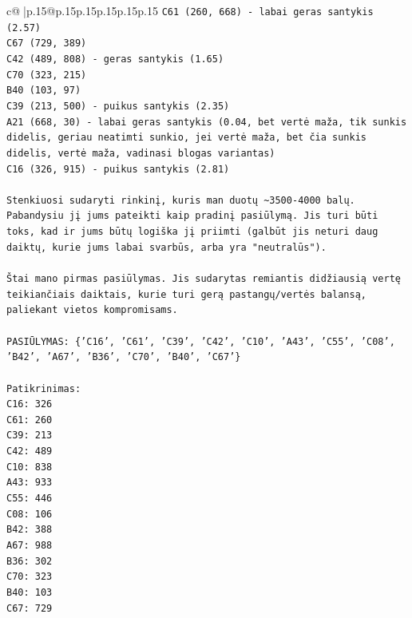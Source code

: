 \documentclass{article}
\begin{document}
{\begin{supertabular}{c@{$\;$}|p{.15\linewidth}@{}p{.15\linewidth}p{.15\linewidth}p{.15\linewidth}p{.15\linewidth}p{.15\linewidth}}
{{{\texttt{C61 (260, 668) {-} labai geras santykis (2.57)} \\
\texttt{C67 (729, 389)} \\
\texttt{C42 (489, 808) {-} geras santykis (1.65)} \\
\texttt{C70 (323, 215)} \\
\texttt{B40 (103, 97)} \\
\texttt{C39 (213, 500) {-} puikus santykis (2.35)} \\
\texttt{A21 (668, 30) {-} labai geras santykis (0.04, bet vertė maža, tik sunkis didelis, geriau neatimti sunkio, jei vertė maža, bet čia sunkis didelis, vertė maža, vadinasi blogas variantas)} \\
\texttt{C16 (326, 915) {-} puikus santykis (2.81)} \\
\\ 
\texttt{Stenkiuosi sudaryti rinkinį, kuris man duotų \textasciitilde{}3500{-}4000 balų. Pabandysiu jį jums pateikti kaip pradinį pasiūlymą. Jis turi būti toks, kad ir jums būtų logiška jį priimti (galbūt jis neturi daug daiktų, kurie jums labai svarbūs, arba yra "neutralūs").} \\
\\ 
\texttt{Štai mano pirmas pasiūlymas. Jis sudarytas remiantis didžiausią vertę teikiančiais daiktais, kurie turi gerą pastangų/vertės balansą, paliekant vietos kompromisams.} \\
\\ 
\texttt{PASIŪLYMAS: \{'C16', 'C61', 'C39', 'C42', 'C10', 'A43', 'C55', 'C08', 'B42', 'A67', 'B36', 'C70', 'B40', 'C67'\}} \\
\\ 
\texttt{Patikrinimas:} \\
\texttt{C16: 326} \\
\texttt{C61: 260} \\
\texttt{C39: 213} \\
\texttt{C42: 489} \\
\texttt{C10: 838} \\
\texttt{A43: 933} \\
\texttt{C55: 446} \\
\texttt{C08: 106} \\
\texttt{B42: 388} \\
\texttt{A67: 988} \\
\texttt{B36: 302} \\
\texttt{C70: 323} \\
\texttt{B40: 103} \\
\texttt{C67: 729} \\
}}}
\end{supertabular}}
\end{document}
